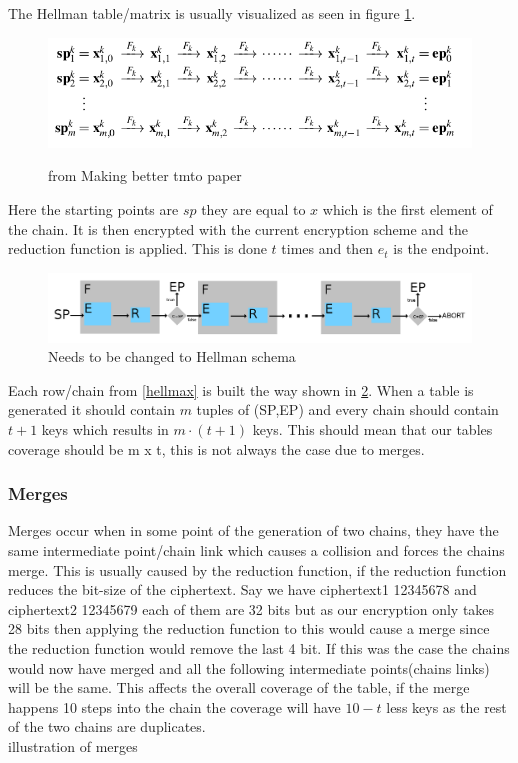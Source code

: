The Hellman table/matrix is usually visualized as seen in figure \ref{fig:hellmax}.
\begin{figure}[th]
  \caption{from Making better tmto paper}
  \includegraphics[width=\textwidth]{figures/HellmanMatrix.png}
  \centering
  \label{fig:hellmax}
\end{figure}

Here the starting points are $sp$ they are equal to $x$ which is the first element of the chain. It is then encrypted with the current encryption scheme and the reduction function is applied. This is done $t$ times and then $e_t$ is the endpoint.

\begin{figure}[th]
  \centering
  \includegraphics[width=\textwidth]{figures/DPSchema.png}
  \caption{Needs to be changed to Hellman schema}
  \label{fig:hellSchema}
\end{figure}

Each row/chain from \ref{hellmax} is built the way shown in \ref{fig:hellSchema}. When a table is generated it should contain $m$ tuples of (SP,EP) and every chain should contain $t+1$ keys which results in $m\cdot(t+1)$ keys. This should mean that our tables coverage should be m x t, this is not always the case due to merges.

\subsubsection{Merges}
Merges occur when in some point of the generation of two chains, they have the same intermediate point/chain link which causes a collision and  forces the chains merge. This is usually caused by the reduction function, if the reduction function reduces the bit-size of the ciphertext. Say we have ciphertext1 12345678 and ciphertext2 12345679 each of them are 32 bits but as our encryption only takes 28 bits then applying the reduction function to this would cause a merge since the reduction function would remove the last 4 bit. If this was the case the chains would now have merged and all the following intermediate points(chains links) will be the same. This affects the overall coverage of the table, if the merge happens 10 steps into the chain the coverage will have $10 - t$ less keys as the rest of the two chains are duplicates.
\\
illustration of merges
